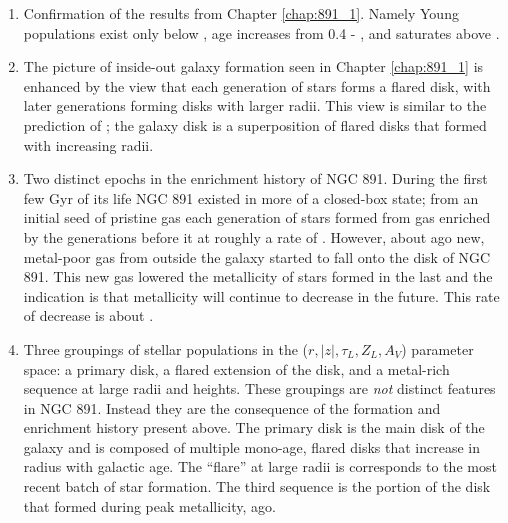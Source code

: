 \begin{enumerate}

\item Confirmation of the results from Chapter
  \ref{chap:891_1}. Namely Young populations exist only below
  , age increases from 0.4 - , and saturates
  above .

\item The picture of inside-out galaxy formation seen in Chapter
  \ref{chap:891_1} is enhanced by the view that each generation of
  stars forms a flared disk, with later generations forming disks with
  larger radii. This view is similar to the prediction of
  \citet{Martig14a}; the galaxy disk is a superposition of flared
  disks that formed with increasing radii.

\item Two distinct epochs in the enrichment history of NGC 891. During
  the first few Gyr of its life NGC 891 existed in more of a
  closed-box state; from an initial seed of pristine gas each
  generation of stars formed from gas enriched by the generations
  before it at roughly a rate of . However, about
   ago new, metal-poor gas from outside the galaxy started
  to fall onto the disk of NGC 891. This new gas lowered the
  metallicity of stars formed in the last  and the
  indication is that metallicity will continue to decrease in the
  future. This rate of decrease is about .

\item Three groupings of stellar populations in the
  ($r,|z|,\tau_L,Z_L,A_V$) parameter space: a primary disk, a flared
  extension of the disk, and a metal-rich sequence at large radii and
  heights. These groupings are \emph{not} distinct features in NGC
  891. Instead they are the consequence of the formation and
  enrichment history present above. The primary disk is the main disk
  of the galaxy and is composed of multiple mono-age, flared disks
  that increase in radius with galactic age. The ``flare'' at large
  radii is corresponds to the most recent batch of star formation. The
  third sequence is the portion of the disk that formed during peak
  metallicity,  ago.

\end{enumerate}

  
